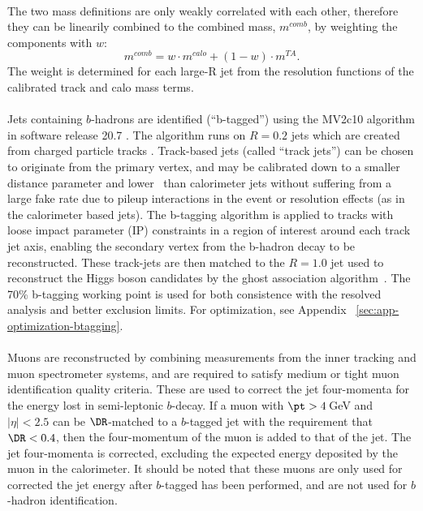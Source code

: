 \paragraph{}
The two mass definitions are only weakly correlated with each other, therefore they can be linearily combined to the combined mass, $m^{comb}$, by weighting the components with $w$:
\begin{equation}
m^{comb} = w\cdot m^{calo}+(1-w)\cdot m^{TA}.
\end{equation}
The weight is determined for each large-R jet from the resolution functions of the calibrated track and calo mass terms.

\paragraph{}
Jets containing $b$-hadrons are identified (``b-tagged'') using the MV2c10 algorithm in software release 20.7 \cite{ATL-PHYS-PUB-2015-022}. The algorithm runs on \akt $R=0.2$ jets which are created from charged particle tracks \cite{ATL-PHYS-PUB-2014-013,ATL-PHYS-PUB-2015-035}. Track-based jets (called ``track jets'') can be chosen to originate from the primary vertex, and may be calibrated down to a smaller distance parameter and lower \pt\ than calorimeter jets without suffering from a large fake rate due to pileup interactions in the event or resolution effects (as in the calorimeter based jets). The b-tagging algorithm is applied to tracks with loose impact parameter (IP) constraints in a region of interest around each track jet axis, enabling the secondary vertex from the b-hadron decay to be reconstructed. These track-jets are then matched to the $R=1.0$ jet used to reconstruct the Higgs boson candidates by the ghost association algorithm~\cite{Cacciari:2007fd}. The 70\% b-tagging working point is used for both consistence with the resolved analysis and better exclusion limits. For optimization, see Appendix ~\ref{sec:app-optimization-btagging}.

\paragraph{}
Muons are reconstructed by combining measurements from the inner tracking and muon spectrometer systems, and are required to satisfy medium or tight muon identification quality criteria. %
These are used to correct the jet four-momenta for the energy lost in semi-leptonic $b$-decay. If a muon with $\pt > 4$\,GeV and $|\eta | < 2.5$ can be $\DR$-matched to a $b$-tagged jet with the requirement that $\DR < 0.4$, then the four-momentum of the muon is added to that of the jet. The jet four-momenta is corrected, excluding the expected energy deposited by the muon in the calorimeter. It should be noted that these muons are only used for corrected the jet energy after $b$-tagged has been performed, and are not used for $b$-hadron identification.

